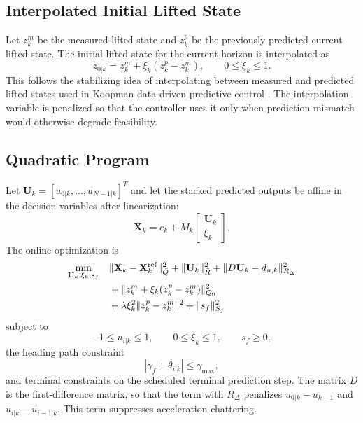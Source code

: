 \documentclass[letterpaper,journal]{IEEEtran}
\begin{document}
\subsection{Interpolated Initial Lifted State}
Let $z_k^m$ be the measured lifted state and $z_k^p$ be the previously predicted current lifted state. The initial lifted state for the current horizon is interpolated as
\begin{equation}
    z_{0|k}=z_k^m+\xi_k(z_k^p-z_k^m),\qquad 0\le \xi_k\le 1 .
    \label{eq:interpolation}
\end{equation}
This follows the stabilizing idea of interpolating between measured and predicted lifted states used in Koopman data-driven predictive control \cite{dejong2024kdpc}. The interpolation variable is penalized so that the controller uses it only when prediction mismatch would otherwise degrade feasibility.

\subsection{Quadratic Program}
Let $\mathbf U_k=[u_{0|k},\ldots,u_{N-1|k}]^T$ and let the stacked predicted outputs be affine in the decision variables after linearization:
\begin{equation}
    \mathbf X_k=c_k+M_k
    \begin{bmatrix}
    \mathbf U_k\\ \xi_k
    \end{bmatrix}.
\end{equation}
The online optimization is
\begin{align}
    \min_{\mathbf U_k,\xi_k,s_f}\quad
    &\|\mathbf X_k-\mathbf X_k^{\rm ref}\|_{\bar Q}^2
    +\|\mathbf U_k\|_{\bar R}^2
    +\|D\mathbf U_k-d_{u,k}\|_{R_\Delta}^2 \nonumber\\
    &+\|z_k^m+\xi_k(z_k^p-z_k^m)\|_{Q_0}^2 \nonumber\\
    &+\lambda \xi_k^2\|z_k^p-z_k^m\|^2
    +\|s_f\|_{S_f}^2
    \label{eq:qp_cost}
\end{align}
subject to
\begin{equation}
    -1\le u_{i|k}\le 1,\qquad 0\le \xi_k\le 1,\qquad s_f\ge0,
\end{equation}
the heading path constraint
\begin{equation}
    |\gamma_f+\theta_{i|k}|\le \gamma_{\max},
\end{equation}
and terminal constraints on the scheduled terminal prediction step. The matrix $D$ is the first-difference matrix, so that the term with $R_\Delta$ penalizes $u_{0|k}-u_{k-1}$ and $u_{i|k}-u_{i-1|k}$. This term suppresses acceleration chattering.
\end{document}
